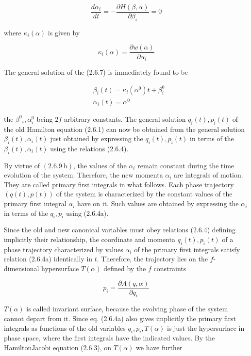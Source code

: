 \documentclass{article}
\begin{document}
 
\begin{equation*}
\frac{d \alpha_{i}}{d t}=-\frac{\partial H(\beta, \alpha)}{\partial \beta_{i}}=0 \tag{2.6.7b}
\end{equation*}
 
where $\kappa_{i}(\alpha)$ is given by
 
\begin{equation*}
\kappa_{i}(\alpha)=\frac{\partial w(\alpha)}{\partial \alpha_{i}} \tag{2.6.8}
\end{equation*}
 

The general solution of the (2.6.7) is immediately found to be
 
\begin{align*}
& \beta_{i}(t)=\kappa_{i}\left(\alpha^{0}\right) t+\beta_{i}^{0}  \tag{2.6.9a}\\
& \alpha_{i}(t)=\alpha^{0} \tag{2.6.9b}
\end{align*}
 
the $\beta^{0}{ }_{i}, \alpha_{i}^{0}$ being $2 f$ arbitrary constants. The general solution $q_{i}(t), p_{i}(t)$ of the old Hamilton equation (2.6.1) can now be obtained from the general solution $\beta_{i}(t), \alpha_{i}(t)$ just obtained by expressing the $q_{i}(t), p_{i}(t)$ in terms of the $\beta_{i}(t), \alpha_{i}(t)$ using the relations (2.6.4).

By virtue of $(2.6 .9 \mathrm{~b})$, the values of the $\alpha_{i}$ remain constant during the time evolution of the system. Therefore, the new momenta $\alpha_{i}$ are integrals of motion. They are called primary first integrals in what follows. Each phase trajectory $(q(t), p(t))$ of the system is characterized by the constant values of the primary first integral $\alpha_{i}$ have on it. Such values are obtained by expressing the $\alpha_{i}$ in terms of the $q_{i}, p_{i}$ using (2.6.4a).

Since the old and new canonical variables must obey relations (2.6.4) defining implicitly their relationship, the coordinate and momenta $q_{i}(t), p_{i}(t)$ of a phase trajectory characterized by values $\alpha_{i}$ of the primary first integrals satisfy relation (2.6.4a) identically in $t$. Therefore, the trajectory lies on the $f$-dimensional hypersurface $T(\alpha)$ defined by the $f$ constraints
 
\begin{equation*}
p_{i}=\frac{\partial A(q, \alpha)}{\partial q_{i}} \tag{2.6.10}
\end{equation*}
 
$T(\alpha)$ is called invariant surface, because the evolving phase of the system cannot depart from it. Since eq. (2.6.4a) also gives implicitly the primary first integrals as functions of the old variables $q_{i}, p_{i}, T(\alpha)$ is just the hypersurface in phase
space, where the first integrals have the indicated values. By the HamiltonJacobi equation (2.6.3), on $T(\alpha)$ we have further
 
\end{document}
